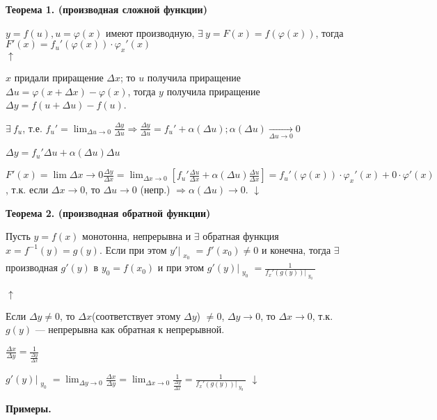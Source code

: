 \documentclass{article}
\begin{document}
    \textbf{Теорема 1. (производная сложной функции)}

    \( y = f(u), u = \varphi(x) \) имеют производную, \( \exists\ y= F(x) = f(\varphi(x)) \), тогда \( F'(x) = f_u'(\varphi(x)) \cdot \varphi_x'(x) \)\\
    \( \uparrow \)
    
    \(x\) придали приращение \(\Delta x\); то \(u\) получила приращение \(\Delta u = \varphi(x + \Delta x) - \varphi(x)\), тогда \(y\) получила приращение \(\Delta y = f(u + \Delta u) - f(u) \).
    
    \(\exists\ f_u\), т.е. \( f_u' = \lim_{\Delta u \to 0} \frac{\Delta y}{\Delta u} \Rightarrow \frac{\Delta y}{\Delta u} = f_u' + \alpha(\Delta u); \alpha(\Delta u) \xrightarrow[\Delta u \to 0]{} 0\)
    
    \(\Delta y = f_u'\Delta u + \alpha(\Delta u)\Delta u\)

    \( F'(x) = \lim{\Delta x \to 0}\frac{\Delta y}{\Delta x} = \lim_{\Delta x \to 0} [f_u'\frac{\Delta u}{\Delta x} + \alpha(\Delta u)\frac{\Delta u}{\Delta x}] = f_u'(\varphi(x)) \cdot \varphi_x'(x) + 0 \cdot \varphi'(x) \), т.к. если \( \Delta x \to 0 \), то \(\Delta u \to 0\) (непр.) \( \Rightarrow \alpha(\Delta u) \to 0 \).
    \(\downarrow\)

    \textbf{Теорема 2. (производная обратной функции)}

    Пусть \( y = f(x) \) монотонна, непрерывна и \(\exists\) обратная функция \( x = f^{-1}(y) = g(y) \). Если при этом \(y'\Bigr|_{\substack{x_0}} = f'(x_0) \neq 0\) и конечна, тогда \(\exists\) производная \( g'(y) \) в \(y_0 = f(x_0)\) и при этом \(g'(y)\Bigr|_{\substack{y_0}} = \frac{1}{f_x'(g(y))\Bigr|_{\substack{y_0}}} \)

    \(\uparrow\) %
    
    Если \( \Delta y \neq 0 \), то \(\Delta x\)(соответствует этому \(\Delta y\)) \(\neq 0\), \(\Delta y \to 0\), то \(\Delta x \to 0\), т.к. \(g(y)\) --- непрерывна как обратная к непрерывной. 

    \(\frac{\Delta x}{\Delta y} = \frac{1}{\frac{\Delta y}{\Delta x}}\)

    \( g'(y)\Bigr|_{\substack{y_0}} = \lim_{\Delta y \to 0} \frac{\Delta x}{\Delta y} = \lim_{\Delta x \to 0} \frac{1}{\frac{\Delta y}{\Delta x}} = \frac{1}{f_x'(g(y))\Bigr|_{\substack{y_0}}} \)
    \(\downarrow\)

    \textbf{Примеры.}
\end{document}
